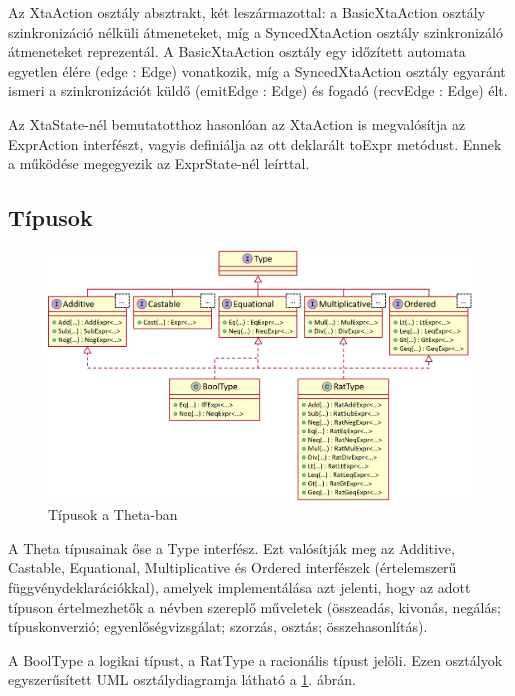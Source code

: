 Az \textsf{XtaAction} osztály absztrakt, két leszármazottal: a \textsf{BasicXtaAction} osztály szinkronizáció nélküli átmeneteket, míg a \textsf{SyncedXtaAction} osztály szinkronizáló átmeneteket reprezentál. A \textsf{BasicXtaAction} osztály egy időzített automata egyetlen élére (\textsf{edge : Edge}) vonatkozik, míg a \textsf{SyncedXtaAction} osztály egyaránt ismeri a szinkronizációt küldő (\textsf{emitEdge : Edge}) és fogadó (\textsf{recvEdge : Edge}) élt.

Az \textsf{XtaState}-nél bemutatotthoz hasonlóan az \textsf{XtaAction} is megvalósítja az \textsf{ExprAction} interfészt, vagyis definiálja az ott deklarált \textsf{toExpr} metódust. Ennek a működése megegyezik az \textsf{ExprState}-nél leírttal.

\subsection{Típusok}

\begin{figure}%
    \centering
    \includegraphics[width=\textwidth, keepaspectratio]{src/figures/type-uml.png}
    \caption{Típusok a Theta-ban}
    \label{fig:type-uml}
\end{figure}

A Theta típusainak őse a \textsf{Type} interfész. Ezt valósítják meg az \textsf{Additive}, \textsf{Castable}, \textsf{Equational}, \textsf{Multiplicative} és \textsf{Ordered} interfészek (értelemszerű függvénydeklarációkkal), amelyek implementálása azt jelenti, hogy az adott típuson értelmezhetők a névben szereplő műveletek (összeadás, kivonás, negálás; típuskonverzió; egyenlőségvizsgálat; szorzás, osztás; összehasonlítás).

A \textsf{BoolType} a logikai típust, a \textsf{RatType} a racionális típust jelöli. Ezen osztályok egyszerűsített UML osztálydiagramja látható a \ref{fig:type-uml}. ábrán.

